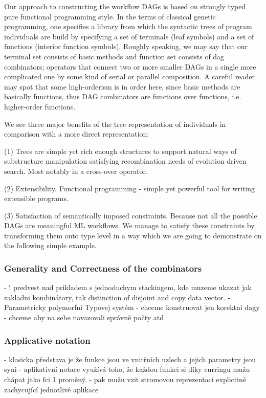 \documentclass[a4paper,oneside]{memoir}
\begin{document}
Our approach to constructing the workflow DAGs is based on strongly typed pure functional programming style. In the terms of classical genetic programming, one specifies a library from which the syntactic trees of program individuals are build by specifying a set of terminals (leaf symbols) and a set of functions (interior function symbols). Roughly speaking, we may say that our terminal set consists of basic methods and function set consists of dag combinators; operators that connect two or more smaller DAGs in a single more complicated one by some kind of serial or parallel composition. A careful reader may spot that some high-orderism is in order here, since basic methods are basically functions, thus DAG combinators are functions over functions, i.e. higher-order functions.

We see three major benefits of the tree representation of individuals in comparison with a more direct representation:

(1) Trees are simple yet rich enough structures to support natural ways of substructure manipulation satisfying recombination needs of evolution driven search. Most notably in a cross-over operator. 

(2) Extensibility. Functional programming - simple yet powerful tool for writing extensible programs. 

(3) Satisfaction of semantically imposed constraints. Because not all the possible DAGs are meaningful ML workflows. We manage to satisfy these constraints by transforming them onto type level in a way which we are going to demonstrate on the following simple example.

\subsubsection{Generality and Correctness of the combinators}

- ! predvest nad prikladem s jednoduchym stackingem, kde muzeme ukazat jak zakladni kombinátory, tak distinction of disjoint and copy data vector.
- Parametricky polymorfní Typovej systém
- chceme konstruovat jen korektní dagy
- chceme aby na sebe navazovali správně počty atd


\subsubsection{Applicative notation}

- klasicka představa je že funkce jsou ve vnitřních uzlech a jejich parametry jsou syni
- aplikativní notace využívá toho, že každou funkci si díky curringu mužu chápat jako fci 1 proměný. 
- pak mužu vzit stromovou reprezentaci explicitně zachycující jednotlivé aplikace
\end{document}
